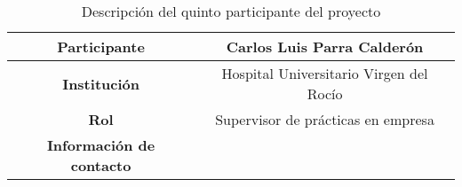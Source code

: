 \begin{table}[H]
    \centering
    \begin{tabular}{|c|c|}
    \hline
    \textbf{Participante} & Carlos Luis Parra Calderón \\
    \hline
    \textbf{Institución} & Hospital Universitario Virgen del Rocío \\
    \hline
    \textbf{Rol} & Supervisor de prácticas en empresa  \\
    \hline
    \textbf{Información de contacto} & \\
    \hline
    \end{tabular}
\caption{Descripción del quinto participante del proyecto}
\label{tab:quintoParticipante}
\end{table}